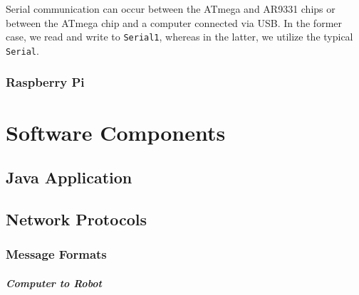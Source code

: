 \documentclass[letterpaper,12pt]{report}
\begin{document}
Serial communication can occur between the ATmega and AR9331 chips or between
the ATmega chip and a computer connected via USB. In the former case, we read
and write to \texttt{Serial1}, whereas in the latter, we utilize the typical
\texttt{Serial}.

\subsection{Raspberry Pi}

\chapter{Software Components}
\section{Java Application}

\section{Network Protocols}

\subsection{Message Formats}

\paragraph{Computer to Robot}
\label{sec:comp_robot_msg}
\end{document}
